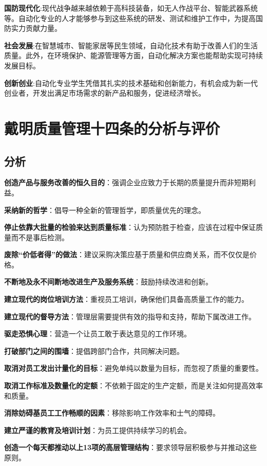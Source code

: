 \documentclass[UTF8,a4paper]{ctexart}
\begin{document}
	\textbf{国防现代化}:现代战争越来越依赖于高科技装备，如无人作战平台、智能武器系统等。自动化专业的人才能够参与到这些系统的研发、测试和维护工作中，为提高国防实力贡献力量。

	\textbf{社会发展}:在智慧城市、智能家居等民生领域，自动化技术有助于改善人们的生活质量。此外，在环境保护、能源管理等方面，自动化解决方案也能帮助实现可持续发展目标。

	\textbf{创新创业}:自动化专业学生凭借其扎实的技术基础和创新能力，有机会成为新一代创业者，开发出满足市场需求的新产品和服务，促进经济增长。
    \newpage

	\section{戴明质量管理十四条的分析与评价}
	\subsection{分析}
	\textbf{创造产品与服务改善的恒久目的}：强调企业应致力于长期的质量提升而非短期利益。

	\textbf{采纳新的哲学}：倡导一种全新的管理哲学，即质量优先的理念。

	\textbf{停止依靠大批量的检验来达到质量标准}：认为预防胜于检查，应该在过程中保证质量而不是事后检测。

	\textbf{废除“价低者得”的做法}：建议采购决策应基于质量和供应商关系，而不仅仅是价格。

	\textbf{不断地及永不间断地改进生产及服务系统}：鼓励持续改进和创新。

	\textbf{建立现代的岗位培训方法}：重视员工培训，确保他们具备高质量工作的能力。

	\textbf{建立现代的督导方法}：管理层需要提供有效的指导和支持，帮助下属改进工作。

	\textbf{驱走恐惧心理}：营造一个让员工敢于表达意见的工作环境。

	\textbf{打破部门之间的围墙}：提倡跨部门合作，共同解决问题。

	\textbf{取消对员工发出计量化的目标}：避免单纯以数量为目标，而忽视了质量的重要性。

	\textbf{取消工作标准及数量化的定额}：不依赖于固定的生产定额，而是关注如何提高效率和质量。

	\textbf{消除妨碍基员工工作畅顺的因素}：移除影响工作效率和士气的障碍。

	\textbf{建立严谨的教育及培训计划}：为员工提供持续学习的机会。

	\textbf{创造一个每天都推动以上13项的高层管理结构}：要求领导层积极参与并推动这些原则。
\end{document}
